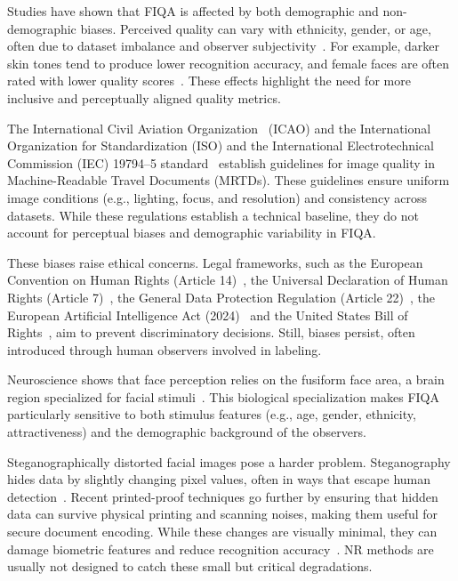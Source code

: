 Studies have shown that FIQA is affected by both demographic and non-demographic biases. Perceived quality can vary with ethnicity, gender, or age, often due to dataset imbalance and observer subjectivity~\cite{cavazos2020racebias, terhorst2020demobias, kabbani2024demo}. For example, darker skin tones tend to produce lower recognition accuracy, and female faces are often rated with lower quality scores~\cite{huang2020facerecon}. These effects highlight the need for more inclusive and perceptually aligned quality metrics.

The International Civil Aviation Organization~\cite{icao-2015} (ICAO) and the International Organization for Standardization (ISO) and the International Electrotechnical Commission (IEC) 19794--5 standard~\cite{iso-iec29794-5-2010} establish guidelines for image quality in Machine-Readable Travel Documents (MRTDs). These guidelines ensure uniform image conditions (e.g., lighting, focus, and resolution) and consistency across datasets. While these regulations establish a technical baseline, they do not account for perceptual biases and demographic variability in FIQA.\@

These biases raise ethical concerns. Legal frameworks, such as the European Convention on Human Rights (Article 14)~\cite{echr-article14}, the Universal Declaration of Human Rights (Article 7)~\cite{udhr-article7}, the General Data Protection Regulation (Article 22)~\cite{gdpr-article22}, the European Artificial Intelligence Act (2024)~\cite{eu-ai-act-2024} and the United States Bill of Rights~\cite{us-ai-bill-rights-2022}, aim to prevent discriminatory decisions. Still, biases persist, often introduced through human observers involved in labeling.

Neuroscience shows that face perception relies on the fusiform face area, a brain region specialized for facial stimuli~\cite{kanwisher2006fusiform, tsao2008mechanisms}. This biological specialization makes FIQA particularly sensitive to both stimulus features (e.g., age, gender, ethnicity, attractiveness) and the demographic background of the observers.

Steganographically distorted facial images pose a harder problem. Steganography hides data by slightly changing pixel values, often in ways that escape human detection~\cite{steganography}. Recent printed-proof techniques go further by ensuring that hidden data can survive physical printing and scanning noises, making them useful for secure document encoding. While these changes are visually minimal, they can damage biometric features and reduce recognition accuracy~\cite{stegastamp2020, codeface2021, stampone2024, riemannian2023}. NR methods are usually not designed to catch these small but critical degradations.

